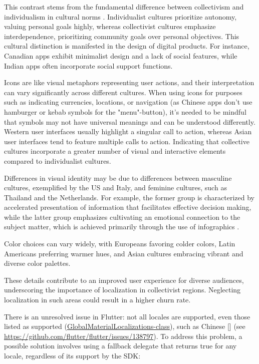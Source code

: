 This contrast stems from the fundamental difference between collectivism and individualism in cultural norms 
\cite{Wall23}. Individualist cultures prioritize autonomy, valuing personal goals highly, whereas collectivist cultures 
emphasize interdependence, prioritizing community goals over personal objectives. This cultural distinction is 
manifested in the design of digital products. For instance, Canadian apps exhibit minimalist design and a lack of social 
features, while Indian apps often incorporate social support functions.

Icons are like visual metaphors representing user actions, and their interpretation can vary significantly across 
different cultures. When using icons for purposes such as indicating currencies, locations, or navigation (as Chinese 
apps don't use hamburger or kebab symbols for the "menu"-button), it's needed to be mindful that symbols may not have 
universal meanings and can be understood differently. Western user interfaces usually highlight a singular call to 
action, whereas Asian user interfaces tend to feature multiple calls to action. Indicating that collective cultures
incorporate a greater number of visual and interactive elements compared to individualist cultures.

Differences in visual identity may be due to differences between masculine cultures, exemplified by the US and Italy, 
and feminine cultures, such as Thailand and the Netherlands. For example, the former group is characterized by 
accelerated presentation of information that facilitates effective decision making, while the latter group emphasizes 
cultivating an emotional connection to the subject matter, which is achieved primarily through the use of infographics
\cite{Wal923}.

Color choices can vary widely, with Europeans favoring colder colors, Latin Americans preferring warmer hues, and Asian 
cultures embracing vibrant and diverse color palettes.


\noindent These details \cite{Rein14} contribute to an improved user experience for diverse audiences, underscoring the 
importance of localization in collectivist regions. Neglecting localization in such areas could result in a higher 
churn rate.

There is an unresolved issue in Flutter: not all locales are supported, even those listed as supported 
(\href{https://api.flutter.dev/flutter/flutter\_localizations/GlobalMaterialLocalizations-class.html}{GlobalMaterialLocalizations-class}), 
such as Chinese [] (see \href{https://github.com/flutter/flutter/issues/138797}{https://github.com/flutter/flutter/issues/138797}). 
To address this problem, a possible solution involves using a fallback delegate that returns true for any locale, 
regardless of its support by the SDK:

